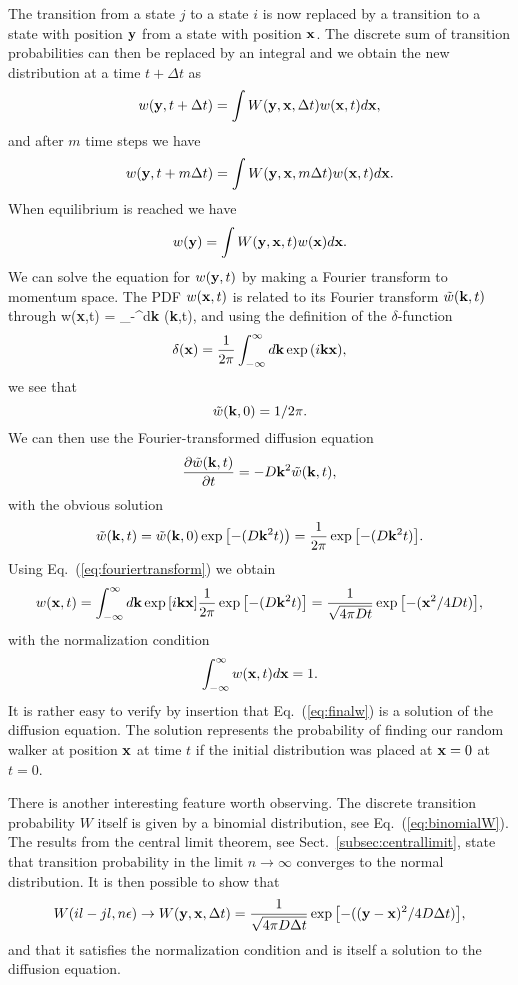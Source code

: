 The transition from a state $j$ to a state $i$ is now replaced by a transition
to a state with position ${\bf y}$ from a state with position ${\bf x}$. 
The discrete sum of transition probabilities can then be replaced by an integral
and we obtain the new distribution at a time $t+\Delta t$ as 
\[
   w({\bf y},t+\Delta t)= \int W({\bf y}, {\bf x}, \Delta t)w({\bf x},t)d{\bf x},
\]
and after $m$ time steps we have
\[
   w({\bf y},t+m\Delta t)= \int W({\bf y}, {\bf x}, m\Delta t)w({\bf x},t)d{\bf x}.
\]
When equilibrium is reached we have
\[
   w({\bf y})= \int W({\bf y}, {\bf x}, t)w({\bf x})d{\bf x}.
\]
We can solve the equation for $w({\bf y},t)$ by making a Fourier transform to
momentum space. 
The PDF $w({\bf x},t)$ is related to its Fourier transform
$\tilde{w}({\bf k},t)$ through
\be\label{eq:fouriertransform}
   w({\bf x},t) = \int_{-\infty}^{\infty}d{\bf k} ({\bf k},t),
\ee
and using the definition of the 
$\delta$-function 
\[
   \delta({\bf x}) = \frac{1}{2\pi} \int_{-\infty}^{\infty}d{\bf k} \exp{(i{\bf kx})},
\]
 we see that
\[
   \tilde{w}({\bf k},0)=1/2\pi.
\]
We can then use the Fourier-transformed diffusion equation 
\begin{equation}
    \frac{\partial \tilde{w}({\bf k},t)}{\partial t} = -D{\bf k}^2\tilde{w}({\bf k},t),
\end{equation}
with the obvious solution
\[
   \tilde{w}({\bf k},t)=\tilde{w}({\bf k},0)\exp{\left[-(D{\bf k}^2t)\right)}=
    \frac{1}{2\pi}\exp{\left[-(D{\bf k}^2t)\right]}. 
\]
Using Eq.~(\ref{eq:fouriertransform}) we obtain 
\begin{equation}\label{eq:finalw}
   w({\bf x},t)=\int_{-\infty}^{\infty}d{\bf k} \exp{\left[i{\bf kx}\right]}\frac{1}{2\pi}\exp{\left[-(D{\bf k}^2t)\right]}=
    \frac{1}{\sqrt{4\pi Dt}}\exp{\left[-({\bf x}^2/4Dt)\right]}, 
\end{equation}
with the normalization condition
\[
   \int_{-\infty}^{\infty}w({\bf x},t)d{\bf x}=1.
\]
It is rather easy to verify by insertion that Eq.~(\ref{eq:finalw}) is a solution
of the diffusion equation. The solution represents the probability of finding
our random walker at position ${\bf x}$ at time $t$ if the initial distribution 
was placed at ${\bf x}=0$ at $t=0$. 

There is another interesting feature worth observing. The discrete transition probability $W$
itself is given by a binomial distribution, see Eq.~(\ref{eq:binomialW}).
The results from the central limit theorem, see Sect.~\ref{subsec:centrallimit}, state that 
transition probability in the limit $n\rightarrow \infty$ converges to the normal 
distribution. It is then possible to show that
\[ 
    W(il-jl,n\epsilon)\rightarrow W({\bf y}, {\bf x}, \Delta t)=
    \frac{1}{\sqrt{4\pi D\Delta t}}\exp{\left[-(({\bf y}-{\bf x})^2/4D\Delta t)\right]},
\]
and that it satisfies the normalization condition and is itself a solution
to the diffusion equation.


